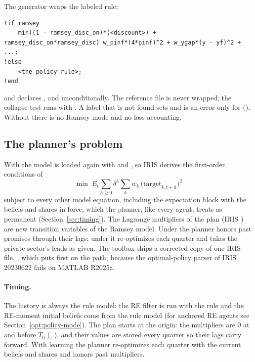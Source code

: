 \documentclass[11pt,a4paper]{article}
\begin{document}
The generator wraps the labeled rule:
\begin{lstlisting}
!if ramsey
    min((1 - ramsey_disc_on)*(<discount>) + ramsey_disc_on*ramsey_disc) w_pinf*(4*pinf)^2 + w_ygap*(y - yf)^2 + ...;
!else
    <the policy rule>;
!end
\end{lstlisting}
and declares ,  and  unconditionally. The
reference file is never wrapped; the collapse test runs with . A label that is
not found sets  and is an error only for 
(). Without  there is no Ramsey mode and no loss
accounting.

\subsection{The planner's problem}\label{sec:ramsey}

With  the model is loaded again with  and
, so IRIS derives the first-order
conditions of
\begin{equation}\label{eq:ramsey}
  \min\; E_t\sum_{h\ge0}\delta^h\sum_k w_k\,\bigl(\text{target}_{k,t+h}\bigr)^2
\end{equation}
subject to every other model equation, including the expectation block with the beliefs and shares
in force, which the planner, like every agent, treats as permanent (Section~\ref{sec:timing}). The Lagrange
multipliers of the plan (IRIS ) are new transition variables of the Ramsey model.
Under  the planner honors past promises through their lags; under
 it re-optimizes each quarter and takes the private sector's leads as given. The toolbox ships a
corrected copy of one IRIS file, , which
 puts first on the path, because the optimal-policy parser of IRIS 20230622 fails
on MATLAB R2025a.

\paragraph{Timing.} The history is always the rule model: the RE filter is run with the rule and
the RE-moment initial beliefs come from the rule model (for anchored RE agents see
Section~\ref{opt:policy-mode}). The plan starts at the origin: the multipliers are 0 at and before $T_0$
(, ), and their values are stored every
quarter so their lags carry forward. With learning the planner re-optimizes each quarter with the
current beliefs and shares and honors past multipliers.
\end{document}
